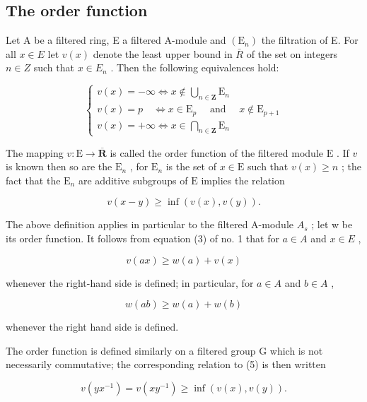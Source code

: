 \subsection{The order function}

Let A be a filtered ring, E a filtered A-module and \((\mathrm{E}_{n})\) the filtration of E. For all \(x \in E\) let \(v(x)\) denote the least upper bound in \(\bar{R}\) of the set on integers \(n \in Z\) such that \(x \in E_{n}\) . Then the following equivalences hold:

\[
\left\{ \begin{array}{l} v (x) = - \infty \Leftrightarrow x \notin \bigcup_ {n \in \mathbf {Z}} \mathrm{E} _ {n} \\ v (x) = p \quad \Leftrightarrow x \in \mathrm{E} _ {p} \quad \text { and } \quad x \notin \mathrm{E} _ {p + 1} \\ v (x) = + \infty \Leftrightarrow x \in \bigcap_ {n \in \mathbf {Z}} \mathrm{E} _ {n} \end{array} \right.\tag{4}
\]

The mapping \(v: \mathrm{E} \to \overline{\mathbf{R}}\) is called the order function of the filtered module \(\mathrm{E}\) . If \(v\) is known then so are the \(\mathrm{E}_n\) , for \(\mathrm{E}_n\) is the set of \(x \in \mathrm{E}\) such that \(v(x) \geqslant n\) ; the fact that the \(\mathrm{E}_n\) are additive subgroups of \(\mathrm{E}\) implies the relation

\[
v (x - y) \geqslant \inf (v (x), v (y)).\tag{5}
\]

The above definition applies in particular to the filtered A-module \(A_{s}\) ; let w be its order function. It follows from equation (3) of no. 1 that for \(a \in A\) and \(x \in E\) ,

\[
v (a x) \geqslant w (a) + v (x)\tag{6}
\]

whenever the right-hand side is defined; in particular, for \(a \in A\) and \(b \in A\) ,

\[
w (a b) \geqslant w (a) + w (b)\tag{7}
\]

whenever the right hand side is defined.

The order function is defined similarly on a filtered group G which is not necessarily commutative; the corresponding relation to (5) is then written

\[
v (y x ^ {- 1}) = v (x y ^ {- 1}) \geqslant \inf (v (x), v (y)).\tag{5'}
\]

